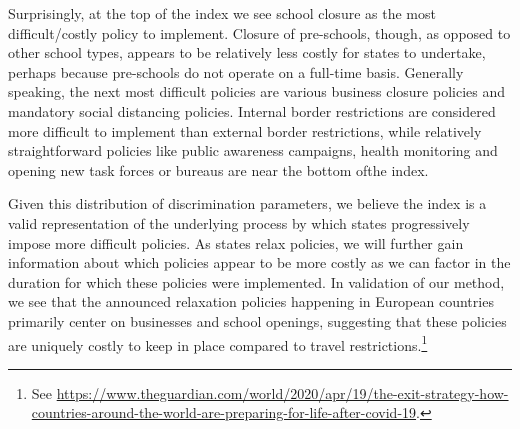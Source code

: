 \documentclass[]{article}
\let\rmarkdownfootnote\footnote%
\def\footnote{\protect\rmarkdownfootnote}
\begin{document}
Surprisingly, at the top of the index we see school closure as the most difficult/costly policy to implement. Closure of pre-schools, though, as opposed to other school types, appears to be relatively less costly for states to undertake, perhaps because pre-schools do not operate on a full-time basis. Generally speaking, the next most difficult policies are various business closure policies and mandatory social distancing policies. Internal border restrictions are considered more difficult to implement than external border restrictions, while relatively straightforward policies like public awareness campaigns, health monitoring and opening new task forces or bureaus are near the bottom ofthe index.

Given this distribution of discrimination parameters, we believe the index is a valid representation of the underlying process by which states progressively impose more difficult policies. As states relax policies, we will further gain information about which policies appear to be more costly as we can factor in the duration for which these policies were implemented. In validation of our method, we see that the announced relaxation policies happening in European countries primarily center on businesses and school openings, suggesting that these policies are uniquely costly to keep in place compared to travel restrictions.\footnote{See \url{https://www.theguardian.com/world/2020/apr/19/the-exit-strategy-how-countries-around-the-world-are-preparing-for-life-after-covid-19}.}
\end{document}
